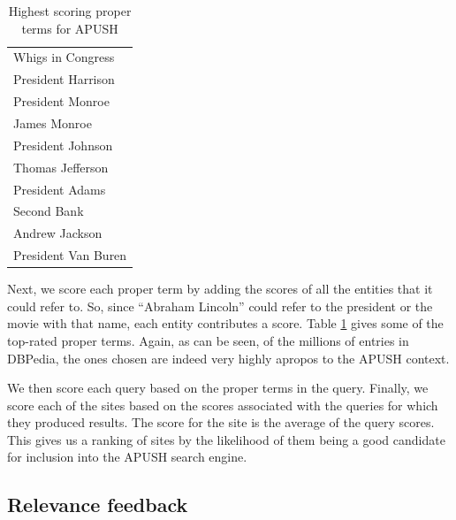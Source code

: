 \documentclass[pdfpagelabels=false,plainpages=true]{acm_proc_article-sp}
\begin{document}
\begin{table}
\begin{center}
\begin{tabular}{|l|} \hline
Whigs in Congress \\
President Harrison \\
President Monroe \\
James Monroe \\
President Johnson \\
Thomas Jefferson \\
President Adams \\
Second Bank \\
Andrew Jackson \\
President Van Buren \\
\hline\end{tabular}
\caption{Highest scoring proper terms for APUSH}
\label{tab-terms}
\end{center}
\end{table}

Next, we score each proper term by adding the scores of all the entities that it
could refer to. So, since ``Abraham Lincoln'' could refer to the president or the
movie with that name, each entity contributes a score. Table \ref{tab-terms}
gives some of the top-rated proper terms. Again, as can be seen, of the millions
of entries in DBPedia, the ones chosen are indeed very highly apropos to the
APUSH context.  

We then score each query based on the proper terms in the query. Finally, we
score each of the sites based on the scores associated with the queries for
which they produced results. The score for the site is the average of the query
scores. This gives us a ranking of sites by the likelihood of them being a good
candidate for inclusion into the APUSH search engine. 

\subsection{Relevance feedback}
\end{document}
